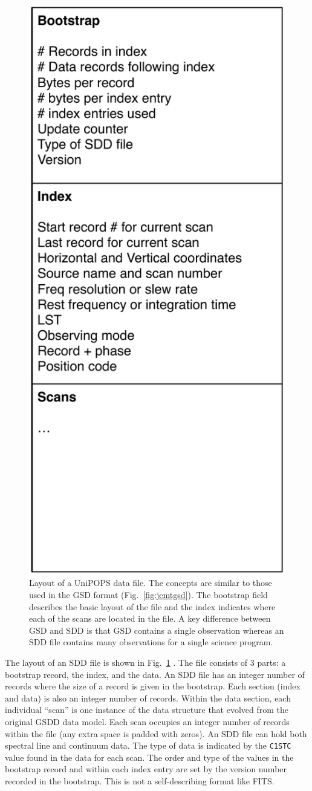\documentclass[final,authoryear,5p,times,twocolumn]{elsarticle}
\begin{document}
\begin{figure}[t]
\begin{center}
\includegraphics[width=0.5\columnwidth]{sdd-file-layout}
\end{center}
\caption{Layout of a UniPOPS data file. The concepts are similar to
  those used in the GSD format (Fig.~\ref{fig:jcmtgsd}). The bootstrap
  field describes the basic layout of the file and the index indicates
  where each of the scans are located in the file. A key difference
  between GSD and SDD is that GSD contains a single observation
  whereas an SDD file contains many observations for a single science
  program.}
\label{fig:nraosdd}
\end{figure}

The layout of an SDD file is shown in Fig.~\ref{fig:nraosdd}
\citep[see also][]{UNIPOPS}.  The file consists of 3 parts: a
bootstrap record, the index, and the data.  An SDD file has an integer
number of records where the size of a record is given in the
bootstrap.  Each section (index and data) is also an integer number of
records.  Within the data section, each individual ``scan'' is one
instance of the data structure that evolved from the original GSDD
data model.  Each scan occupies an integer number of records within
the file (any extra space is padded with zeros).  An SDD file can hold
both spectral line and continuum data.  The type of data is indicated
by the \texttt{C1STC} value found in the data for each scan. The order
and type of the values in the bootstrap record and within each index
entry are set by the version number recorded in the bootstrap.  This
is not a self-describing format like FITS.
\end{document}
